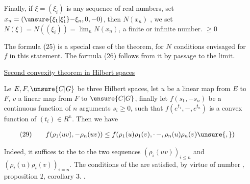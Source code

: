 
 Finally, if $\xi=(\xi_i)$ is any sequence of  real numbers, set $x_n=(\unsure{\xi_1|\xi'_1}\mathord{-}\xi_n,0,\mathord{-}0)$, then $N(x_n)$ ,  we set $N(\xi)=N((\xi_i))=\lim_n N(x_n)$, a finite or infinite number. $\geq0$

 The formula (25) is a special case of the theorem, for $N$  conditions envisaged for $f$ in this statement. The formula (26) follows from it by passage to the limit.

{\reversemarginpar{}}\uline{Second convexity theorem in Hilbert spaces}

{\reversemarginpar{}}
Le $E,F,\unsure{C|G}$ be three Hilbert spaces, let $u$ be a  linear map from $E$ to $F$,  $v$ a  linear map from $F$ to $\unsure{C|G}$,  finally let $f(s_1,\mathord{-}s_n)$ be a continuous  function of $n$ arguments $s_i\geq0$, such that  $f(e^{t_1},\mathord{-},e^{t_n})$ is a convex function of $(t_i)\in R^n$. Then we have

\[
\begin{array}{@{}l@{\qquad}l@{}}
(29)&\displaystyle f(\rho_1(uv),\mathord{-}\rho_n(uv))\leq f(\rho_1(u)\rho_1(v),\mathord{\cdot}\,\mathord{-},\rho_n(u)\rho_n(v)\unsure{,})
\end{array}
\]

Indeed, it suffices to  the   to the two sequences $(\rho_i(uv))_{i\leq n}$ and $(\rho_i(u)\rho_i(v))_{i=n}$. The conditions  of the  are satisfied,  by virtue of number , proposition 2, corollary 3. .

